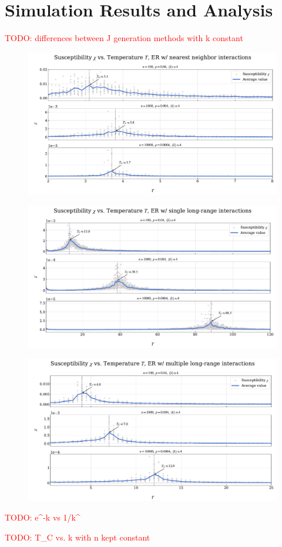 \documentclass[11pt,a4paper]{article}
\newcommand{\todo}[1]{\textcolor{red}{TODO: #1}}
\begin{document}
\section{Simulation Results and Analysis}

\todo{differences between J generation methods with k constant}

\begin{figure}[ht!]
    \includegraphics[width=\textwidth]{../figures/suscept_ER_nearest.pdf}
\end{figure}

\begin{figure}[ht!]
    \includegraphics[width=\textwidth]{../figures/suscept_ER_single.pdf}
\end{figure}

\begin{figure}[ht!]
    \includegraphics[width=\textwidth]{../figures/suscept_ER_multiple.pdf}
\end{figure}

\todo{e^{-\alpha k} vs 1/k^\alpha}

\todo{T_C vs. k with n kept constant}
\end{document}
